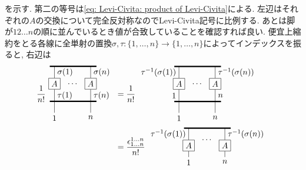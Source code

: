 \documentclass[dvipdfmx]{jsarticle}
\begin{document}
を示す.
第二の等号は\eqref{eq: Levi-Civita: product of Levi-Civita}による.
左辺はそれぞれの$A$の交換について完全反対称なのでLevi-Civita記号に比例する.
あとは脚が$12\dots n$の順に並んでいるとき値が合致していることを確認すれば良い.
便宜上縮約をとる各線に全単射の置換$\sigma,\tau: \{1,\dots,n\}\to\{1,\dots,n\}$によってインデックスを振ると, 右辺は
\begin{equation*}
    \begin{split}
        \frac{1}{n!}
        \vcenter{\hbox{
            \begin{tikzpicture}
                \draw[ultra thick]
                    (0,0)--++(2,0)
                    (0,-1.5)--++(2,0)
                ;
                \draw
                    (.2,0)--++(0,-.5)node[anchor=north, draw, rectangle](A){$A$}
                    (A.south)--++(0,-1)node[anchor=north]{$1$}
                    (1.75,0)--++(0,-.5)node[anchor=north, draw, rectangle](B){$A$}
                    (B.south)--++(0,-1)node[anchor=north]{$n$}
                ;
                \node at(1,-.75)[anchor=center]{$\cdots$};
                \node at(.2,-.25)[anchor=west]{$\sigma(1)$};
                \node at(1.75,-.25)[anchor=west]{$\sigma(n)$};
                \node at(.2,-1.25)[anchor=west]{$\tau(1)$};
                \node at(1.75,-1.25)[anchor=west]{$\tau(n)$};
            \end{tikzpicture}
        }}
        &=
        \frac{1}{n!}
        \vcenter{\hbox{
            \begin{tikzpicture}
                \draw[ultra thick]
                    (0,0)--++(2,0)
                    (0,-1.5)--++(2,0)
                ;
                \draw
                    (.2,0)--++(0,-.5)node[anchor=north, draw, rectangle](A){$A$}
                    (A.south)--++(0,-1)node[anchor=north]{$1$}
                    (1.75,0)--++(0,-.5)node[anchor=north, draw, rectangle](B){$A$}
                    (B.south)--++(0,-1)node[anchor=north]{$n$}
                ;
                \node at(1,-.75)[anchor=center]{$\cdots$};
                \node at(.2,-.25)[anchor=east]{$\tau^{-1}(\sigma(1))$};
                \node at(1.75,-.25)[anchor=west]{$\tau^{-1}(\sigma(n))$};
                \node at(.2,-1.25)[anchor=east]{$1$};
                \node at(1.75,-1.25)[anchor=west]{$n$};
            \end{tikzpicture}
        }}
        \\
        &=
        \frac{\epsilon^{1\dots n}_{1\dots n}}{n!}
        \vcenter{\hbox{
            \begin{tikzpicture}
                \draw[ultra thick](0,0)--++(2,0);
                \draw
                    (.2,0)--++(0,-.5)node[anchor=north, draw, rectangle](A){$A$}
                    (A.south)--++(0,-.25)node[anchor=north]{$1$}
                    (1.75,0)--++(0,-.5)node[anchor=north, draw, rectangle](B){$A$}
                    (B.south)--++(0,-.25)node[anchor=north]{$n$}
                ;
                \node at(1,-.5)[anchor=center]{$\cdots$};
                \node at(.2,-.25)[anchor=east]{$\tau^{-1}(\sigma(1))$};
                \node at(1.75,-.25)[anchor=west]{$\tau^{-1}(\sigma(n))$};
            \end{tikzpicture}
        }}
    \end{split}
\end{equation*}
\end{document}
